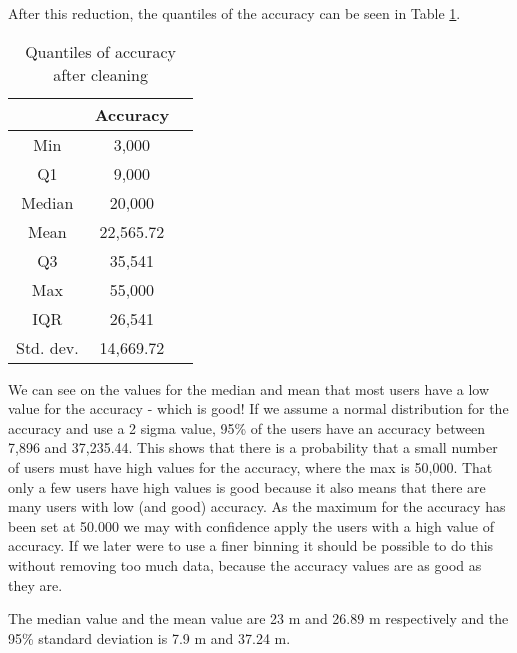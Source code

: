 After this reduction, the quantiles of the accuracy can be seen in Table \ref{tab:acc_quantiles}. 
 \begin{table}[htbp]
        \centering
        \small
        \setlength\tabcolsep{2pt}
        \begin{tabular}{|c|c|c|}
            \hline
                         & Accuracy      \\[0pt]
            \hline
                 Min     &  3,000       \\
            \hline
                 Q1      &  9,000   \\
            \hline
                 Median  &  20,000    \\
            \hline
                 Mean    &  22,565.72    \\
            \hline
                 Q3      &  35,541      \\
            \hline
                 Max &  55,000   \\
            \hline
                 IQR     &   26,541     \\
            \hline
                Std. dev.  &  14,669.72   \\
            \hline
        \end{tabular}
        \caption{Quantiles of accuracy after cleaning} %
        \label{tab:acc_quantiles}
\end{table}

We can see on the values for the median and mean that most users have a low value for the accuracy - which is good! If we assume a normal distribution for the accuracy and use a 2 sigma value, 95\% of the users have an accuracy between 7,896 and 37,235.44. This shows that there is a probability that a small number of users must have high values for the accuracy, where the max is 50,000. That only a few users have high values is good because it also means that there are many users with low (and good) accuracy. As the maximum for the accuracy has been set at 50.000 we may with confidence apply the users with a high value of accuracy. If we later were to use a finer binning it should be possible to do this without removing too much data, because the accuracy values are as good as they are.   

The median value and the mean value are 23 m and 26.89 m respectively and the 95\% standard deviation is 7.9 m and 37.24 m. 


